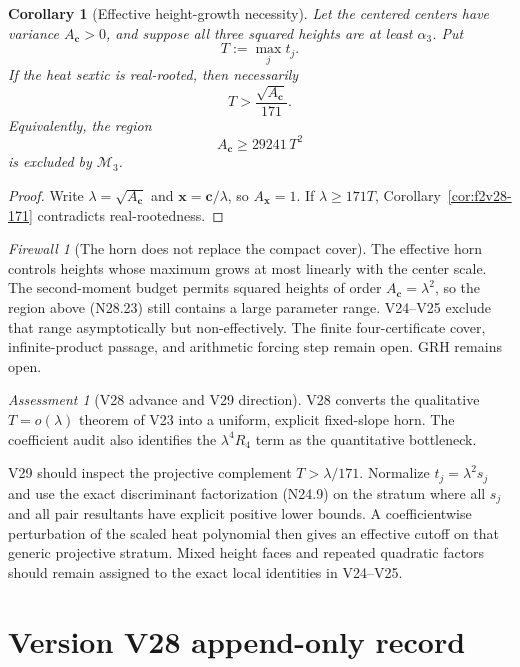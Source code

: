 \documentclass[11pt]{article}
\newtheorem{corollary}[theorem]{Corollary}
\theoremstyle{definition}
\theoremstyle{remark}
\newtheorem{assessment}[theorem]{Assessment}
\newtheorem{firewall}[theorem]{Firewall}
\begin{document}
\begin{corollary}[Effective height-growth necessity]
\label{cor:f2v28-growth}
Let the centered centers have variance \(A_{\bm c}>0\), and suppose all
three squared heights are at least \(\alpha_3\).  Put
\[
 T:=\max_jt_j.
 \tag{N28.22}
\]
If the heat sextic is real-rooted, then necessarily
\[
 T>\frac{\sqrt{A_{\bm c}}}{171}.
 \tag{N28.23}
\]
Equivalently, the region
\[
 A_{\bm c}\geq29241\,T^2
 \tag{N28.24}
\]
is excluded by \(\mathcal M_3\).
\end{corollary}

\begin{proof}
Write \(\lambda=\sqrt{A_{\bm c}}\) and
\(\bm x=\bm c/\lambda\), so \(A_{\bm x}=1\).
If \(\lambda\geq171T\), Corollary~\ref{cor:f2v28-171} contradicts
real-rootedness.
\end{proof}

\begin{firewall}[The horn does not replace the compact cover]
\label{fire:f2v28}
The effective horn controls heights whose maximum grows at most linearly
with the center scale.  The second-moment budget permits squared heights
of order \(A_{\bm c}=\lambda^2\), so the region above
\textup{(N28.23)} still contains a large parameter range.  V24--V25
exclude that range asymptotically but non-effectively.  The finite
four-certificate cover, infinite-product passage, and arithmetic forcing
step remain open.  GRH remains open.
\end{firewall}

\begin{assessment}[V28 advance and V29 direction]
\label{ass:f2v28}
V28 converts the qualitative \(T=o(\lambda)\) theorem of V23 into a
uniform, explicit fixed-slope horn.  The coefficient audit also identifies
the \(\lambda^4R_4\) term as the quantitative bottleneck.

V29 should inspect the projective complement \(T>\lambda/171\).  Normalize
\(t_j=\lambda^2s_j\) and use the exact discriminant factorization
\textup{(N24.9)} on the stratum where all \(s_j\) and all pair resultants
have explicit positive lower bounds.  A coefficientwise perturbation of
the scaled heat polynomial then gives an effective cutoff on that generic
projective stratum.  Mixed height faces and repeated quadratic factors
should remain assigned to the exact local identities in V24--V25.
\end{assessment}

\section*{Version V28 append-only record}
\end{document}
